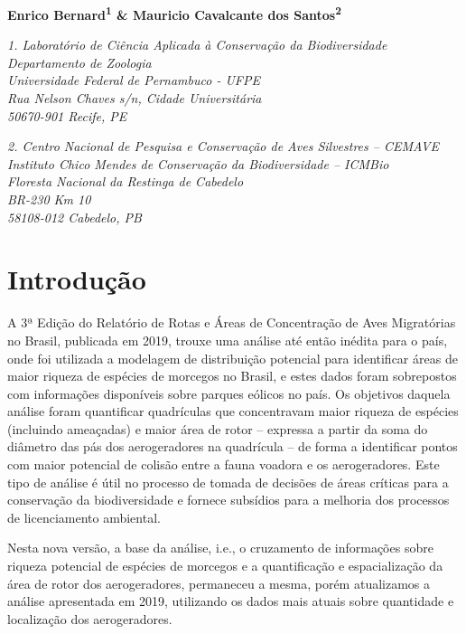 \documentclass[
  oneside]{scrbook}
\begin{document}
\pagestyle{headings}

\textbf{Enrico Bernard\textsuperscript{1} \& Mauricio Cavalcante dos Santos\textsuperscript{2}}

\emph{1. Laboratório de Ciência Aplicada à Conservação da Biodiversidade}\\
\emph{Departamento de Zoologia}\\
\emph{Universidade Federal de Pernambuco - UFPE}\\
\emph{Rua Nelson Chaves s/n, Cidade Universitária}\\
\emph{50670-901 Recife, PE}

\emph{2. Centro Nacional de Pesquisa e Conservação de Aves Silvestres -- CEMAVE}\\
\emph{Instituto Chico Mendes de Conservação da Biodiversidade -- ICMBio}\\
\emph{Floresta Nacional da Restinga de Cabedelo}\\
\emph{BR-230 Km 10}\\
\emph{58108-012 Cabedelo, PB}

\hypertarget{introduuxe7uxe3o}{%
\section{Introdução}\label{introduuxe7uxe3o}}

A 3ª Edição do Relatório de Rotas e Áreas de Concentração de Aves Migratórias no Brasil, publicada em 2019, trouxe uma análise até então inédita para o país, onde foi utilizada a modelagem de distribuição potencial para identificar áreas de maior riqueza de espécies de morcegos no Brasil, e estes dados foram sobrepostos com informações disponíveis sobre parques eólicos no país. Os objetivos daquela análise foram quantificar quadrículas que concentravam maior riqueza de espécies (incluindo ameaçadas) e maior área de rotor -- expressa a partir da soma do diâmetro das pás dos aerogeradores na quadrícula -- de forma a identificar pontos com maior potencial de colisão entre a fauna voadora e os aerogeradores. Este tipo de análise é útil no processo de tomada de decisões de áreas críticas para a conservação da biodiversidade e fornece subsídios para a melhoria dos processos de licenciamento ambiental.

Nesta nova versão, a base da análise, i.e., o cruzamento de informações sobre riqueza potencial de espécies de morcegos e a quantificação e espacialização da área de rotor dos aerogeradores, permaneceu a mesma, porém atualizamos a análise apresentada em 2019, utilizando os dados mais atuais sobre quantidade e localização dos aerogeradores.
\end{document}
